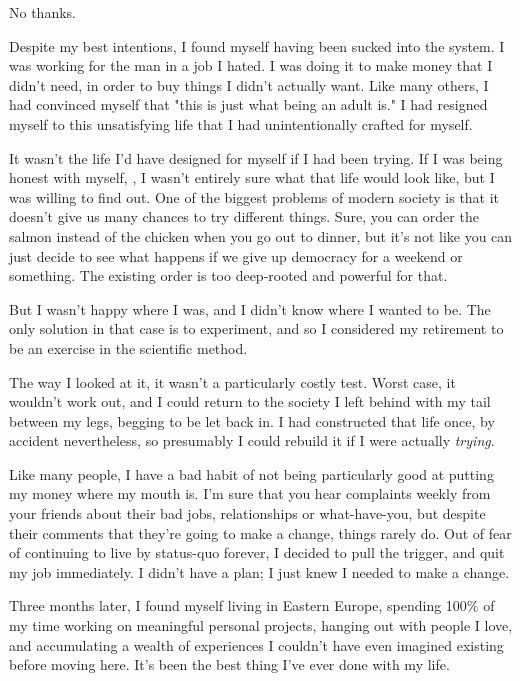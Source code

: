 \documentclass[]{book}
\newcommand{\emphasis}[1]{\textit{#1}}
\begin{document}
No thanks.

Despite my best intentions, I found myself having been sucked into the system. I
was working for the man in a job I hated. I was doing it to make money that I
didn't need, in order to buy things I didn't actually want. Like many others, I
had convinced myself that "this is just what being an adult is." I had resigned
myself to this unsatisfying life that I had unintentionally crafted for myself.

It wasn't the life I'd have designed for myself if I had been trying. If I was
being honest with myself, , I wasn't entirely sure what that life would look
like, but I was willing to find out. One of the biggest problems of modern
society is that it doesn't give us many chances to try different things. Sure,
you can order the salmon instead of the chicken when you go out to dinner, but
it's not like you can just decide to see what happens if we give up democracy
for a weekend or something.  The existing order is too deep-rooted and powerful
for that.

But I wasn't happy where I was, and I didn't know where I wanted to be. The only
solution in that case is to experiment, and so I considered my retirement to be
an exercise in the scientific method.

The way I looked at it, it wasn't a particularly costly test. Worst case, it
wouldn't work out, and I could return to the society I left behind with my tail
between my legs, begging to be let back in. I had constructed that life once, by
accident nevertheless, so presumably I could rebuild it if I were actually
\emphasis{trying}.

Like many people, I have a bad habit of not being particularly good at putting
my money where my mouth is.  I'm sure that you hear
complaints weekly from your friends about their bad jobs, relationships or
what-have-you, but despite their comments that they're going to make a change,
things rarely do. Out of fear of continuing to live by status-quo forever, I
decided to pull the trigger, and quit my job immediately. I didn't have a plan;
I just knew I needed to make a change.

Three months later, I found myself living in Eastern Europe, spending 100\% of
my time working on meaningful personal projects, hanging out with people I love,
and accumulating a wealth of experiences I couldn't have even imagined existing
before moving here. It's been the best thing I've ever done with my life.
\end{document}
